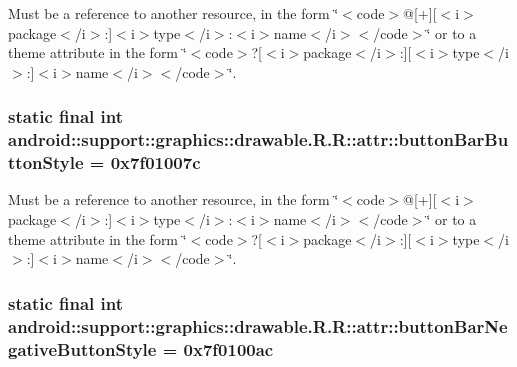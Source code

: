 Must be a reference to another resource, in the form \char`\"{}$<$code$>$@\mbox{[}+\mbox{]}\mbox{[}$<$i$>$package$<$/i$>$:\mbox{]}$<$i$>$type$<$/i$>$:$<$i$>$name$<$/i$>$$<$/code$>$\char`\"{} or to a theme attribute in the form \char`\"{}$<$code$>$?\mbox{[}$<$i$>$package$<$/i$>$:\mbox{]}\mbox{[}$<$i$>$type$<$/i$>$:\mbox{]}$<$i$>$name$<$/i$>$$<$/code$>$\char`\"{}. \hypertarget{classandroid_1_1support_1_1graphics_1_1drawable_1_1_r_1_1attr_59f3e94359324bea84cc9d5a2e432d22}{
\subsubsection[{buttonBarButtonStyle}]{\setlength{\rightskip}{0pt plus 5cm}static final int android::support::graphics::drawable.R.R::attr::buttonBarButtonStyle = 0x7f01007c}}
\label{classandroid_1_1support_1_1graphics_1_1drawable_1_1_r_1_1attr_59f3e94359324bea84cc9d5a2e432d22}


Must be a reference to another resource, in the form \char`\"{}$<$code$>$@\mbox{[}+\mbox{]}\mbox{[}$<$i$>$package$<$/i$>$:\mbox{]}$<$i$>$type$<$/i$>$:$<$i$>$name$<$/i$>$$<$/code$>$\char`\"{} or to a theme attribute in the form \char`\"{}$<$code$>$?\mbox{[}$<$i$>$package$<$/i$>$:\mbox{]}\mbox{[}$<$i$>$type$<$/i$>$:\mbox{]}$<$i$>$name$<$/i$>$$<$/code$>$\char`\"{}. \hypertarget{classandroid_1_1support_1_1graphics_1_1drawable_1_1_r_1_1attr_0c3b6b8d4b089c4dd8df5b10be0d7320}{
\subsubsection[{buttonBarNegativeButtonStyle}]{\setlength{\rightskip}{0pt plus 5cm}static final int android::support::graphics::drawable.R.R::attr::buttonBarNegativeButtonStyle = 0x7f0100ac}}
\label{classandroid_1_1support_1_1graphics_1_1drawable_1_1_r_1_1attr_0c3b6b8d4b089c4dd8df5b10be0d7320}


